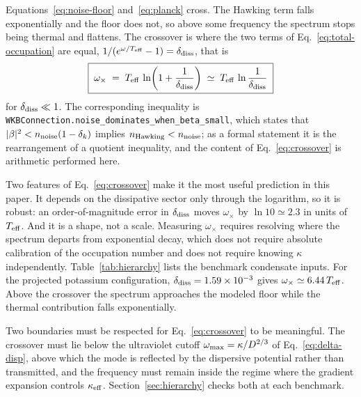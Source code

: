 \documentclass[aps,prd,reprint,nofootinbib,superscriptaddress]{revtex4-2}
\begin{document}
Equations~\eqref{eq:noise-floor} and~\eqref{eq:planck} cross. The
Hawking term falls exponentially and the floor does not, so above some
frequency the spectrum stops being thermal and flattens. The crossover
is where the two terms of Eq.~\eqref{eq:total-occupation} are equal,
$1/(e^{\omega/T_{\rm eff}} - 1) = \delta_{\rm diss}$, that is
\begin{equation}
\boxed{\;
\omega_\times \;=\; T_{\rm eff}\,
  \ln\!\left(1 + \frac{1}{\delta_{\rm diss}}\right)
  \;\simeq\; T_{\rm eff}\,\ln\frac{1}{\delta_{\rm diss}} \; }
\label{eq:crossover}
\end{equation}
for $\delta_{\rm diss} \ll 1$. The corresponding inequality is
\texttt{WKBConnection.noise\_dominates\_when\_beta\_small}, which states
that $|\beta|^2 < n_{\rm noise}(1-\delta_k)$ implies
$n_{\rm Hawking} < n_{\rm noise}$; as a formal statement it is the
rearrangement of a quotient inequality, and the content of
Eq.~\eqref{eq:crossover} is arithmetic performed here.

Two features of Eq.~\eqref{eq:crossover} make it the most useful
prediction in this paper. It depends on the dissipative sector only
through the logarithm, so it is robust: an order-of-magnitude error in
$\delta_{\rm diss}$ moves $\omega_\times$ by $\ln 10 \simeq 2.3$ in
units of $T_{\rm eff}$. And it is a shape, not a scale. Measuring
$\omega_\times$ requires resolving where the spectrum departs from
exponential decay, which does not require absolute calibration of the
occupation number and does not require knowing $\kappa$ independently.
Table~\ref{tab:hierarchy} lists the benchmark condensate inputs. For
the projected potassium configuration, $\delta_{\rm diss} = 1.59\times10^{-3}$
gives $\omega_\times \simeq 6.44\,T_{\rm eff}$. Above the crossover the
spectrum approaches the modeled floor while the thermal contribution
falls exponentially.

Two boundaries must be respected for Eq.~\eqref{eq:crossover} to be
meaningful. The crossover must lie below the ultraviolet cutoff
$\omega_{\rm max} = \kappa/D^{2/3}$ of Eq.~\eqref{eq:delta-disp}, above
which the mode is reflected by the dispersive potential rather than
transmitted, and the frequency must remain inside the regime where the
gradient expansion controls $\kappa_{\rm eff}$. Section~\ref{sec:hierarchy}
checks both at each benchmark.

\end{document}
